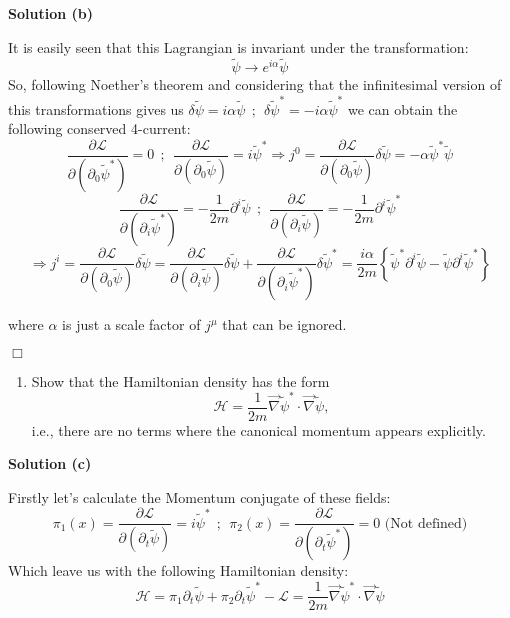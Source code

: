 \documentclass[12pt]{article}
\newcommand{\qedwhite}{\hfill \ensuremath{\Box}}
\begin{document}
\color{blue}

\textbf{Solution (b)}

It is easily seen that this Lagrangian is invariant under the transformation:
\[
    \tilde{\psi}\longrightarrow e^{i\alpha}\tilde{\psi}
\]
So, following Noether's theorem and considering that the infinitesimal version of this transformations gives us \(\delta\tilde{\psi}=i\alpha\tilde{\psi} ~~;~~ \delta\tilde{\psi}^*=-i\alpha \tilde{\psi}^*\) we can obtain the following conserved 4-current:
\[
    \frac{\partial \mathcal{L}}{\partial(\partial_0 \tilde{\psi}^*)} = 0 ~~;~~ \frac{\partial \mathcal{L}}{\partial(\partial_0 \tilde{\psi})} = i\tilde{\psi}^* \Longrightarrow j^0 = \frac{\partial \mathcal{L}}{\partial(\partial_0 \tilde{\psi})}\delta\tilde{\psi} = -\alpha\tilde{\psi}^*\tilde{\psi}
\]
\[
    \frac{\partial \mathcal{L}}{\partial(\partial_i \tilde{\psi}^*)} = -\frac{1}{2m}\partial^i\tilde{\psi} ~~;~~    \frac{\partial \mathcal{L}}{\partial(\partial_i \tilde{\psi})} = -\frac{1}{2m}\partial^i\tilde{\psi}^*
\]
\[
    \Longrightarrow j^i = \frac{\partial \mathcal{L}}{\partial(\partial_0 \tilde{\psi})}\delta\tilde{\psi} = \frac{\partial \mathcal{L}}{\partial(\partial_i \tilde{\psi})}\delta\tilde{\psi} + \frac{\partial \mathcal{L}}{\partial(\partial_i \tilde{\psi}^*)} \delta\tilde{\psi}^* = \frac{i\alpha}{2m}\left\{\tilde{\psi}^*\partial^i\tilde{\psi}-\tilde{\psi}\partial^i\tilde{\psi}^*\right\}
\]

where \(\alpha\) is just a scale factor of \(j^\mu\) that can be ignored.

\qedwhite

\color{black}

\begin{enumerate}[label=(\alph*), start = 3]
    \item Show that the Hamiltonian density has the form
        \[\mathcal{H}=\frac{1}{2m}\vec{\nabla}\tilde{\psi}^*\cdot\vec{\nabla}\tilde{\psi},\]
    i.e., there are no terms where the canonical momentum appears explicitly.
\end{enumerate}

\color{blue}

\color{blue}

\textbf{Solution (c)}

Firstly let's calculate the Momentum conjugate of these fields:
\[
    \pi_1(x) = \frac{\partial\mathcal{L}}{\partial(\partial_t\tilde{\psi})}=i\tilde{\psi}^* ~~;~~\pi_2(x) = \frac{\partial\mathcal{L}}{\partial(\partial_t\tilde{\psi}^*)}=0 \text{ (Not defined)}
\]
Which leave us with the following Hamiltonian density:
\[
    \mathcal{H}=\pi_1\partial_t\tilde{\psi}+\pi_2\partial_t\tilde{\psi}^*-\mathcal{L}=\frac{1}{2m}\vec{\nabla}\tilde{\psi}^*\cdot\vec{\nabla}\tilde{\psi}
\]
\end{document}
